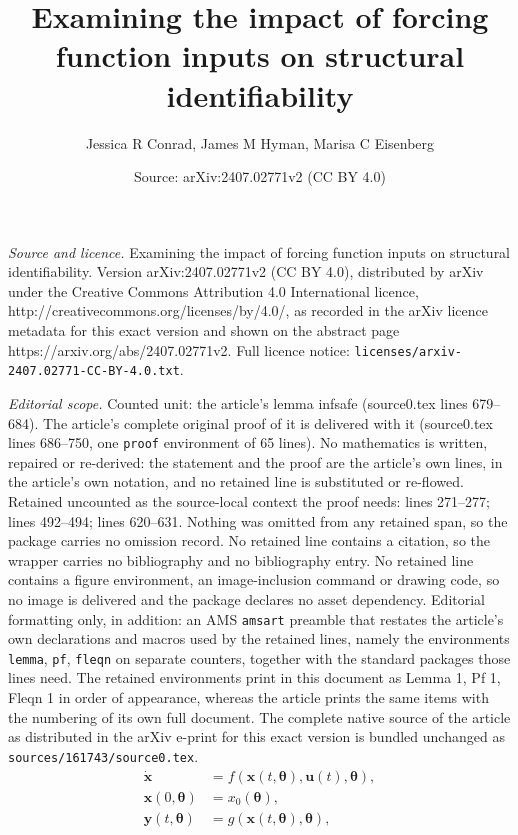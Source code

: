 \documentclass[10pt,a4paper]{amsart}
\title{Examining the impact of forcing function inputs on structural identifiability}
\author{Jessica R Conrad, James M Hyman, Marisa C Eisenberg}
\date{Source: arXiv:2407.02771v2 (CC BY 4.0)}
\begin{document}
\maketitle

\noindent\emph{Source and licence.} Examining the impact of forcing function inputs on structural identifiability. Version arXiv:2407.02771v2 (CC BY 4.0), distributed by arXiv under the Creative Commons Attribution 4.0 International licence, http://creativecommons.org/licenses/by/4.0/, as recorded in the arXiv licence metadata for this exact version and shown on the abstract page https://arxiv.org/abs/2407.02771v2. Full licence notice: \texttt{licenses/arxiv-2407.02771-CC-BY-4.0.txt}.\par\smallskip

\noindent\textit{Editorial scope.} Counted unit: the article's lemma infsafe (source0.tex lines 679--684). The article's complete original proof of it is delivered with it (source0.tex lines 686--750, one \texttt{proof} environment of 65 lines). No mathematics is written, repaired or re-derived: the statement and the proof are the article's own lines, in the article's own notation, and no retained line is substituted or re-flowed.  Retained uncounted as the source-local context the proof needs: lines 271--277; lines 492--494; lines 620--631.  Nothing was omitted from any retained span, so the package carries no omission record.  No retained line contains a citation, so the wrapper carries no bibliography and no bibliography entry.  No retained line contains a figure environment, an image-inclusion command or drawing code, so no image is delivered and the package declares no asset dependency.  Editorial formatting only, in addition: an AMS \texttt{amsart} preamble that restates the article's own declarations and macros used by the retained lines, namely the environments \texttt{lemma}, \texttt{pf}, \texttt{fleqn} on separate counters, together with the standard packages those lines need.  The retained environments print in this document as Lemma 1, Pf 1, Fleqn 1 in order of appearance, whereas the article prints the same items with the numbering of its own full document.  The complete native source of the article as distributed in the arXiv e-print for this exact version is bundled unchanged as \texttt{sources/161743/source0.tex}.
\begin{equation} \label{eq:model}
    \begin{aligned}
    \dot{\pmb{x}} &=f(\pmb{x}(t, \pmb{\theta}),\pmb{u}(t),\pmb{\theta}),\\
    \pmb{x}(0, \pmb{\theta}) &= x_0(\pmb{\theta}), \\
    \pmb{y}(t, \pmb{\theta}) &= g(\pmb{x}(t, \pmb{\theta}), \pmb{\theta}),
    \end{aligned}
\end{equation}
\end{document}
